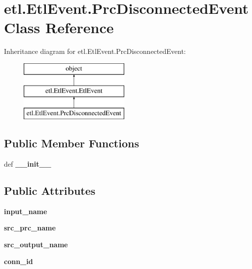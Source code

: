 \hypertarget{classetl_1_1EtlEvent_1_1PrcDisconnectedEvent}{\section{etl.\-Etl\-Event.\-Prc\-Disconnected\-Event Class Reference}
\label{classetl_1_1EtlEvent_1_1PrcDisconnectedEvent}
}
Inheritance diagram for etl.\-Etl\-Event.\-Prc\-Disconnected\-Event\-:\begin{figure}[H]
\begin{center}
\leavevmode
\includegraphics[height=3.000000cm]{classetl_1_1EtlEvent_1_1PrcDisconnectedEvent}
\end{center}
\end{figure}
\subsection*{Public Member Functions}
\begin{DoxyCompactItemize}
\item 
\hypertarget{classetl_1_1EtlEvent_1_1PrcDisconnectedEvent_ace6515dd505e4c88c29f52c7ca6ca37b}{def {\bfseries \-\_\-\-\_\-init\-\_\-\-\_\-}}\label{classetl_1_1EtlEvent_1_1PrcDisconnectedEvent_ace6515dd505e4c88c29f52c7ca6ca37b}

\end{DoxyCompactItemize}
\subsection*{Public Attributes}
\begin{DoxyCompactItemize}
\item 
\hypertarget{classetl_1_1EtlEvent_1_1PrcDisconnectedEvent_aba70f0d0a8c597bf251871d3b4f0e403}{{\bfseries input\-\_\-name}}\label{classetl_1_1EtlEvent_1_1PrcDisconnectedEvent_aba70f0d0a8c597bf251871d3b4f0e403}

\item 
\hypertarget{classetl_1_1EtlEvent_1_1PrcDisconnectedEvent_a4fad07f5bd96833a00455cfc3b699c9b}{{\bfseries src\-\_\-prc\-\_\-name}}\label{classetl_1_1EtlEvent_1_1PrcDisconnectedEvent_a4fad07f5bd96833a00455cfc3b699c9b}

\item 
\hypertarget{classetl_1_1EtlEvent_1_1PrcDisconnectedEvent_ac48e1e52a9419767be6e8e6958e870ad}{{\bfseries src\-\_\-output\-\_\-name}}\label{classetl_1_1EtlEvent_1_1PrcDisconnectedEvent_ac48e1e52a9419767be6e8e6958e870ad}

\item 
\hypertarget{classetl_1_1EtlEvent_1_1PrcDisconnectedEvent_a6a416398001426bff5d90e9c6d5ae451}{{\bfseries conn\-\_\-id}}\label{classetl_1_1EtlEvent_1_1PrcDisconnectedEvent_a6a416398001426bff5d90e9c6d5ae451}

\end{DoxyCompactItemize}



